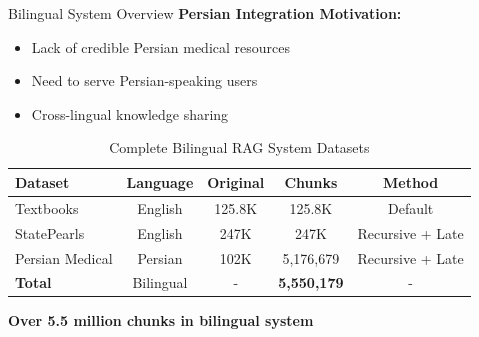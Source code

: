 \begin{frame}{Bilingual System Overview}
    \textbf{Persian Integration Motivation:}
    \begin{itemize}
        \item Lack of credible Persian medical resources
        \item Need to serve Persian-speaking users
        \item Cross-lingual knowledge sharing
    \end{itemize}
    
    \vspace{0.5em}
    
    \begin{table}[h]
        \centering
        \footnotesize
        \caption{Complete Bilingual RAG System Datasets}
        \begin{tabular}{lcccc}
            \toprule
            \textbf{Dataset} & \textbf{Language} & \textbf{Original} & \textbf{Chunks} & \textbf{Method} \\
            \midrule
            Textbooks & English & 125.8K & 125.8K & Default \\
            StatePearls & English & 247K & 247K & Recursive + Late \\
            \rowcolor{highlight!20} Persian Medical & Persian & 102K & 5,176,679 & Recursive + Late \\
            \midrule
            \textbf{Total} & Bilingual & - & \textbf{5,550,179} & - \\
            \bottomrule
        \end{tabular}
    \end{table}
    
    \begin{center}
        \colorbox{improvement!20}{\textbf{Over 5.5 million chunks in bilingual system}}
    \end{center}
\end{frame}

